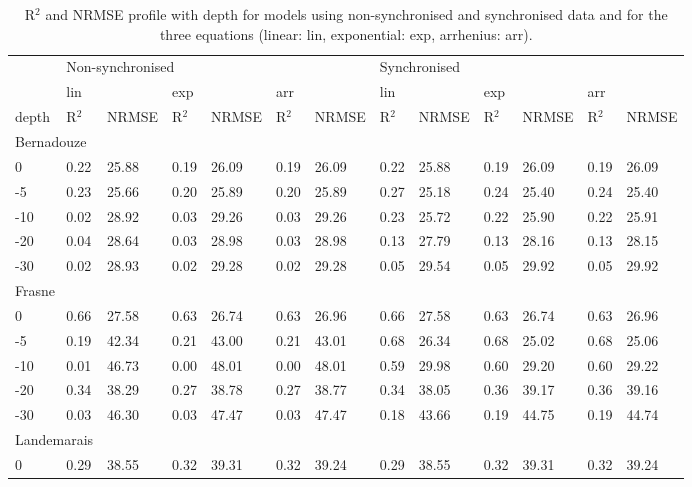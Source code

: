 \begin{table}
\centering
\caption{R$^{2}$ and NRMSE profile with depth for models using non-synchronised and synchronised data and for the three equations (linear: lin, exponential: exp, arrhenius: arr).}
\begin{tabular}{lllllllllllll}
\hline
& \multicolumn{6}{l}{Non-synchronised} & \multicolumn{6}{l}{Synchronised} \\
 & lin &  & exp &  & arr & & lin &  & exp &  & arr &  \\[-1ex] 
depth & R$^{2}$ & NRMSE & R$^{2}$ & NRMSE & R$^{2}$ & NRMSE & R$^{2}$ & NRMSE & R$^{2}$ & NRMSE & R$^{2}$ & NRMSE \\ 
\hline
\multicolumn{2}{l}{Bernadouze} & & & & & & & & & & & \\[-1ex]
0 & 0.22 & 25.88 & 0.19 & 26.09 & 0.19 & 26.09 & 0.22 & 25.88 & 0.19 & 26.09 & 0.19 & 26.09\\[-1ex] 
-5 & 0.23 & 25.66 & 0.20 & 25.89 & 0.20 & 25.89 & 0.27 & 25.18 & 0.24 & 25.40 & 0.24 & 25.40\\[-1ex] 
-10 & 0.02 & 28.92 & 0.03 & 29.26 & 0.03 & 29.26 & 0.23 & 25.72 & 0.22 & 25.90 & 0.22 & 25.91\\[-1ex] 
-20 & 0.04 & 28.64 & 0.03 & 28.98 & 0.03 & 28.98 & 0.13 & 27.79 & 0.13 & 28.16 & 0.13 & 28.15\\[-1ex] 
-30 & 0.02 & 28.93 & 0.02 & 29.28 & 0.02 & 29.28 & 0.05 & 29.54 & 0.05 & 29.92 & 0.05 & 29.92\\
\multicolumn{2}{l}{Frasne} & & & & & & & & & & & \\[-1ex]
0 & 0.66 & 27.58 & 0.63 & 26.74 & 0.63 & 26.96 & 0.66 & 27.58 & 0.63 & 26.74 & 0.63 & 26.96\\[-1ex]
-5 & 0.19 & 42.34 & 0.21 & 43.00 & 0.21 & 43.01 & 0.68 & 26.34 & 0.68 & 25.02 & 0.68 & 25.06\\[-1ex] 
-10 & 0.01 & 46.73 & 0.00 & 48.01 & 0.00 & 48.01 & 0.59 & 29.98 & 0.60 & 29.20 & 0.60 & 29.22\\[-1ex] 
-20 & 0.34 & 38.29 & 0.27 & 38.78 & 0.27 & 38.77 & 0.34 & 38.05 & 0.36 & 39.17 & 0.36 & 39.16\\[-1ex] 
-30 & 0.03 & 46.30 & 0.03 & 47.47 & 0.03 & 47.47 & 0.18 & 43.66 & 0.19 & 44.75 & 0.19 & 44.74\\
\multicolumn{2}{l}{Landemarais} & & & & & & & & & & & \\[-1ex]
0 & 0.29 & 38.55 & 0.32 & 39.31 & 0.32 & 39.24 & 0.29 & 38.55 & 0.32 & 39.31 & 0.32 & 39.24\\[-1ex] 

\end{tabular}
\end{table}
